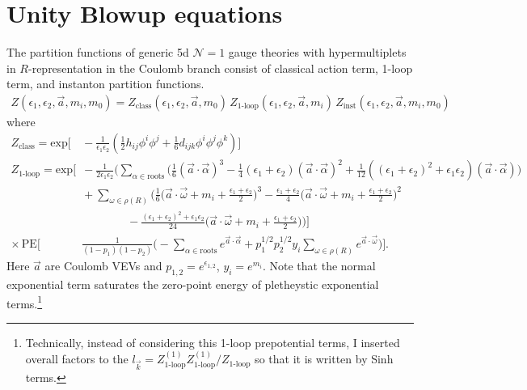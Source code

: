 \documentclass[12pt]{article}
\begin{document}
\makeatletter {} \makeatother
\renewcommand{\theequation}{\thesection.\arabic{equation}}
\renewcommand{\thefootnote}{\alph{footnote}}
\section{Unity Blowup equations}
The partition functions of generic 5d $\mathcal{N}=1$ gauge theories with hypermultiplets in $R$-representation in the Coulomb branch consist of classical action term, 1-loop term, and instanton partition functions.
\begin{align}
Z(\epsilon_1,\epsilon_2,\vec{a},m_i,m_0)=Z_{\textrm{class}}(\epsilon_1,\epsilon_2,\vec{a},m_0)\,Z_{\textrm{1-loop}}(\epsilon_1,\epsilon_2,\vec{a},m_i)\,Z_{\textrm{inst}}(\epsilon_1,\epsilon_2,\vec{a},m_i,m_0)
\label{eq:bueq_gen}
\end{align}
where
\begin{align}
Z_{\textrm{class}}=\textrm{exp}\Bigg[&\,-\frac{1}{\epsilon_1\epsilon_2}\left(\frac{1}{2}h_{ij}\phi^i\phi^j+\frac{1}{6}d_{ijk}\phi^{i}\phi^j\phi^k\right)\Bigg]\nonumber\\
Z_{\textrm{1-loop}}=\textrm{exp}\Bigg[&\,-\frac{1}{2\epsilon_1\epsilon_2}\Bigg(\sum_{\alpha\in\textrm{roots}}\Bigg(\frac{1}{6}(\vec{a}\cdot\vec{\alpha})^3-\frac{1}{4}(\epsilon_1+\epsilon_2)(\vec{a}\cdot\vec{\alpha})^2+\frac{1}{12}((\epsilon_1+\epsilon_2)^2+\epsilon_1\epsilon_2)(\vec{a}\cdot\vec{\alpha})\Bigg)\nonumber\\
&\,+\sum_{\omega\in\rho(R)}\Bigg(\frac{1}{6}\Big(\vec{a}\cdot\vec{\omega}+m_i+\frac{\epsilon_1+\epsilon_2}{2}\Big)^3-\frac{\epsilon_1+\epsilon_2}{4}\Big(\vec{a}\cdot\vec{\omega}+m_i+\frac{\epsilon_1+\epsilon_2}{2}\Big)^2\nonumber\\
&\,\qquad\qquad-\frac{(\epsilon_1+\epsilon_2)^2+\epsilon_1\epsilon_2}{24}\Big(\vec{a}\cdot\vec{\omega}+m_i+\frac{\epsilon_1+\epsilon_2}{2}\Big)\Bigg)\Bigg]\nonumber\\
\times\,\textrm{PE}\Bigg[&\,\frac{1}{(1-p_1)(1-p_2)}\Bigg(-\sum_{\alpha\in\textrm{roots}}e^{\vec{a}\cdot\vec{\alpha}}+p_1^{1/2}p_2^{1/2}y_i\sum_{\omega\in \rho(R)}e^{\vec{a}\cdot\vec{\omega}}\Bigg)\Bigg].
\end{align}
Here $\vec{a}$ are Coulomb VEVs and $p_{1,2}=e^{\epsilon_{1,2}}$, $y_i=e^{m_i}$. Note that the normal exponential term saturates the zero-point energy of pletheystic exponential terms.\footnote{Technically, instead of considering this 1-loop prepotential terms, I inserted overall factors to the $l_{\vec{k}}=Z_{\textrm{1-loop}}^{(1)}Z_{\textrm{1-loop}}^{(1)}/Z_{\textrm{1-loop}}$ so that it is written by Sinh terms.} 
\end{document}

